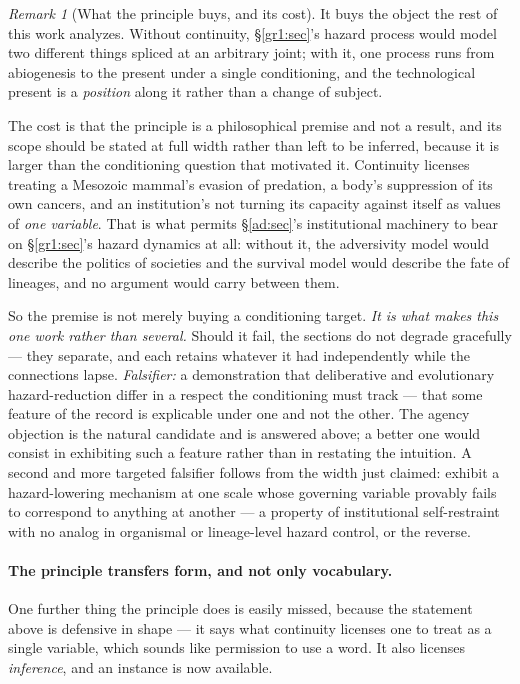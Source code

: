 \documentclass[11pt]{article}
\numberwithin{equation}{section}
\theoremstyle{plain}
\theoremstyle{definition}
\theoremstyle{remark}
\newtheorem{remark}[theorem]{Remark}
\begin{document}
\begin{remark}[What the principle buys, and its cost]
\label{gc:rem:continuitycost}
It buys the object the rest of this work analyzes. Without continuity,
\S\ref{gr1:sec}'s hazard process would model two different things
spliced at an arbitrary joint; with it, one process runs from
abiogenesis to the present under a single conditioning, and the
technological present is a \emph{position} along it rather than a change
of subject.

The cost is that the principle is a philosophical premise and not a
result, and its scope should be stated at full width rather than left to
be inferred, because it is larger than the conditioning question that
motivated it. Continuity licenses treating a Mesozoic mammal's evasion
of predation, a body's suppression of its own cancers, and an
institution's not turning its capacity against itself as values of
\emph{one variable}. That is what permits \S\ref{ad:sec}'s institutional
machinery to bear on \S\ref{gr1:sec}'s hazard dynamics at all: without
it, the adversivity model would describe the politics of societies and
the survival model would describe the fate of lineages, and no argument
would carry between them.

So the premise is not merely buying a conditioning target. \emph{It is
what makes this one work rather than several.} Should it fail, the
sections do not degrade gracefully --- they separate, and each retains
whatever it had independently while the connections lapse. \emph{Falsifier:} a demonstration that deliberative and evolutionary
hazard-reduction differ in a respect the conditioning must track ---
that some feature of the record is explicable under one and not the
other. The agency objection is the natural candidate and is answered
above; a better one would consist in exhibiting such a feature rather
than in restating the intuition. A second and more targeted falsifier
follows from the width just claimed: exhibit a hazard-lowering mechanism
at one scale whose governing variable provably fails to correspond to
anything at another --- a property of institutional self-restraint with
no analog in organismal or lineage-level hazard control, or the
reverse.
\end{remark}

\paragraph{The principle transfers form, and not only vocabulary.}\label{gc:rem:continuitydeductive}
One further thing the principle does is easily missed, because the
statement above is defensive in shape --- it says what continuity
licenses one to treat as a single variable, which sounds like permission
to use a word. It also licenses \emph{inference}, and an instance is now
available.
\end{document}
